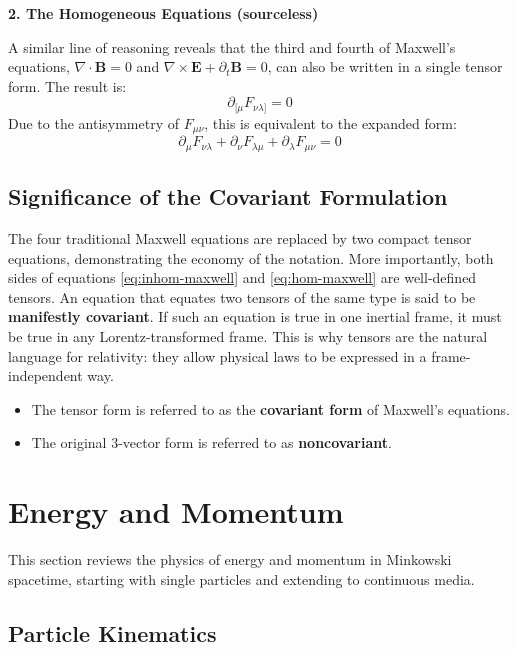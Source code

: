 \documentclass[11pt, a4paper]{report}
\begin{document}
\textbf{2. The Homogeneous Equations (sourceless)}

A similar line of reasoning reveals that the third and fourth of Maxwell's equations, $\nabla \cdot \mathbf{B} = 0$ and $\nabla \times \mathbf{E} + \partial_t \mathbf{B} = 0$, can also be written in a single tensor form. The result is:
\begin{equation}\label{eq:hom-maxwell}
    \partial_{[\mu} F_{\nu\lambda]} = 0
\end{equation}
Due to the antisymmetry of $F_{\mu\nu}$, this is equivalent to the expanded form:
\begin{equation}
    \partial_\mu F_{\nu\lambda} + \partial_\nu F_{\lambda\mu} + \partial_\lambda F_{\mu\nu} = 0
\end{equation}

\subsection*{Significance of the Covariant Formulation}

The four traditional Maxwell equations are replaced by two compact tensor equations, demonstrating the economy of the notation. More importantly, both sides of equations  \eqref{eq:inhom-maxwell} and \eqref{eq:hom-maxwell}  are well-defined tensors. An equation that equates two tensors of the same type is said to be \textbf{manifestly covariant}. If such an equation is true in one inertial frame, it must be true in any Lorentz-transformed frame. This is why tensors are the natural language for relativity: they allow physical laws to be expressed in a frame-independent way.

\begin{itemize}
    \item The tensor form is referred to as the \textbf{covariant form} of Maxwell's equations.
    \item The original 3-vector form is referred to as \textbf{noncovariant}.
\end{itemize}
\section{Energy and Momentum}

This section reviews the physics of energy and momentum in Minkowski spacetime, starting with single particles and extending to continuous media.

\subsection*{Particle Kinematics}
\end{document}
